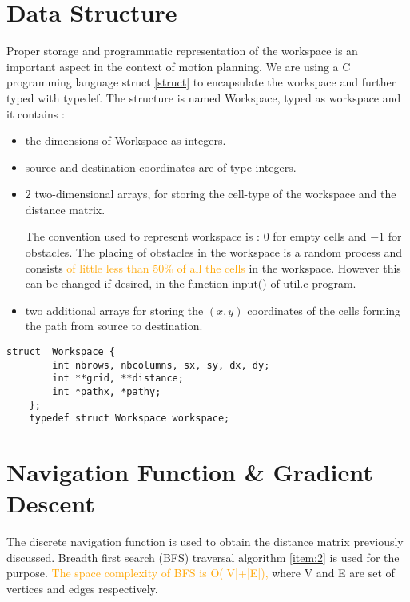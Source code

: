 \documentclass[12pt]{article}
\begin{document}
\section{Data Structure}
	Proper storage and programmatic representation of the workspace is
  an important aspect in the context of motion planning. We are using
  a \textsf{C} programming language \textsf{struct} \autoref{struct} to encapsulate the
  workspace and further typed with \textsf{typedef}. The structure
  is named \textsf{Workspace}, typed as \textsf{workspace} and it
  contains :	
	\begin{itemize}
	\item the dimensions of Workspace as \textsf{integers}.
	\item source and destination coordinates are of type \textsf{integers}.
	\item $2$ two-dimensional \textsf{arrays}, for storing the cell-type of the workspace and the distance matrix.
    
	The convention used to represent workspace is : $0$ for empty
  cells and $-1$ for obstacles. The placing
  of obstacles in the workspace is a random process and consists
  \textcolor{orange} {of little less than 50\% of all the cells} in the
  workspace. However this can be changed if desired, in the function \textsf{input()} of \textsf{util.c} program.

	\item two additional \textsf{arrays} for storing the $(x, y)$
    coordinates of the cells forming the path from source to
    destination. \\
	\end{itemize}
  
  
  \lstset{                                    %
  language=C,
  frame=lines,
  captionpos=b
 }


\renewcommand{\lstlistingname}{Code}
	
	\begin{lstlisting}[caption=Workspace struct, label=struct]
	struct  Workspace {
		int nbrows, nbcolumns, sx, sy, dx, dy;
		int **grid, **distance;
		int *pathx, *pathy;
	};
	typedef struct Workspace workspace;
	\end{lstlisting}
	

\section{Navigation Function \& Gradient Descent}
	The discrete navigation function is used to obtain the distance matrix previously discussed. Breadth first search (BFS) traversal
  algorithm \ref{item:2} is used for the purpose. \textcolor{orange}{The space complexity of BFS is
    \textsf{O(|V|+|E|)},} where V and E are set of vertices and edges respectively. 
\end{document}
